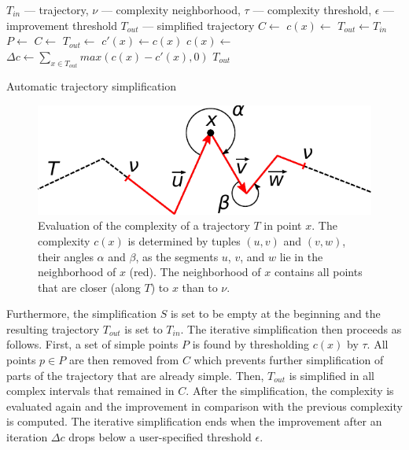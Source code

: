 \begin{algorithm} [htb]
  \begin{algorithmic}[1]
	  \Require $T_{in}$ --- trajectory, $\nu$ --- complexity neighborhood, $\tau$ --- complexity threshold, $\epsilon$ --- improvement threshold
	  \Ensure $T_{out}$ --- simplified trajectory
			\State $C \gets$  
			\State $c(x) \gets$ 
			\State
			\State $T_{out} \gets T_{in}$
			\Repeat
			  \State $P \gets$ 
				\State $C \gets$ 
			  \State
					\State $T_{out} \gets$ 
			  \EndFor
				\State
				\State $c'(x) \gets c(x)$ %
				\State $c(x) \gets$ 
				\State
				\State $\Delta c \gets \sum_{x \in T_{out}}{max(c(x) - c'(x), 0)}$
				\State {}
			\State
			\State \Return $T_{out}$
		\EndProcedure
  \end{algorithmic}
	\caption{Automatic trajectory simplification}
  \label{alg:auto-simplify}
\end{algorithm}

\begin{figure}
	\includegraphics[width=0.95\linewidth]{img/complexity.pdf}
\caption{Evaluation of the complexity of a trajectory $T$ in point $x$.
The complexity $c(x)$ is determined by tuples $(u, v)$ and $(v, w)$, \ie their angles $\alpha$ and $\beta$, as the segments $u$, $v$, and $w$ lie in the neighborhood of $x$ (red).
The neighborhood of $x$ contains all points that are closer (along $T$) to $x$ than to $\nu$.}
\label{fig:complexity}
\end{figure}

Furthermore, the simplification $S$ is set to be empty at the beginning and the resulting trajectory $T_{out}$ is set to $T_{in}$.
The iterative simplification then proceeds as follows.
First, a set of simple points $P$ is found by thresholding $c(x)$ by $\tau$.
All points $p \in P$ are then removed from $C$ which prevents further simplification of parts of the trajectory that are already simple.
Then, $T_{out}$ is simplified in all complex intervals that remained in $C$.
After the simplification, the complexity is evaluated again and the improvement in comparison with the previous complexity is computed.
The iterative simplification ends when the improvement after an iteration $\Delta c$ drops below a user-specified threshold $\epsilon$.


